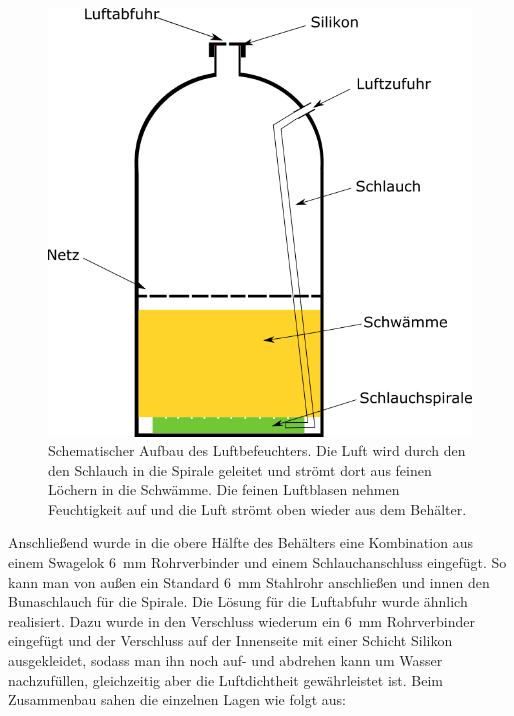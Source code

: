 \begin{figure}[h!]
	\begin{center}
		\includegraphics[scale=0.47]{Luftbefeuchter.png}
		\caption[Schema Luftbefeuchter]{Schematischer Aufbau des Luftbefeuchters. Die Luft wird durch den den Schlauch in die Spirale geleitet und strömt dort aus feinen Löchern in die Schwämme. Die feinen Luftblasen nehmen Feuchtigkeit auf und die Luft strömt oben wieder aus dem Behälter.}
	\end{center}
\end{figure}


Anschließend wurde in die obere Hälfte des Behälters eine Kombination aus einem Swagelok \SI{6}{mm} Rohrverbinder und einem Schlauchanschluss eingefügt. So kann man von außen ein Standard \SI{6}{mm} Stahlrohr anschließen und innen den Bunaschlauch für die Spirale. Die Lösung für die Luftabfuhr wurde ähnlich realisiert. Dazu wurde in den Verschluss wiederum ein \SI{6}{mm} Rohrverbinder eingefügt und der Verschluss auf der Innenseite mit einer Schicht Silikon ausgekleidet, sodass man ihn noch auf- und abdrehen kann um Wasser nachzufüllen, gleichzeitig aber die Luftdichtheit gewährleistet ist.
Beim Zusammenbau sahen die einzelnen Lagen wie folgt aus:

\clearpage

